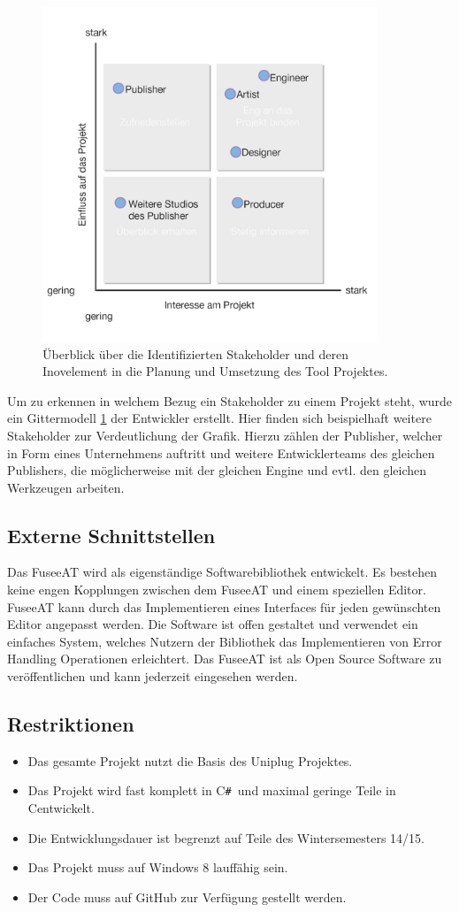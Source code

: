 \documentclass[pagesize, paper=a4, fontsize=12pt, titlepage=true, headings=small, headnosepline, abstractoff, liststotoc, nochapterprefix, plainheadsepline, twoside]{scrreprt}
\newcommand{\CSS}{C\texttt{\# }}
\newcommand{\CPP}{C\nolinebreak\hspace{-.05em}\raisebox{.4ex}{\tiny\bf +}\nolinebreak\hspace{-.10em}\raisebox{.4ex}{\tiny\bf +}}
\begin{document}
\begin{figure}[ht]
	\centering
	\includegraphics[width=10cm]{Bilder/Stakeholder_Diagramm.jpg}
	\caption{Überblick über die Identifizierten Stakeholder und deren Inovelement in die Planung und Umsetzung des Tool Projektes.}
	\label{StakeholderGrafik}
\end{figure}
Um zu erkennen in welchem Bezug ein Stakeholder zu einem Projekt steht, wurde ein Gittermodell \ref{StakeholderGrafik} der Entwickler erstellt. Hier finden sich beispielhaft weitere Stakeholder zur Verdeutlichung der Grafik. Hierzu zählen der Publisher, welcher in Form eines Unternehmens auftritt und weitere Entwicklerteams des gleichen Publishers, die möglicherweise mit der gleichen Engine und evtl. den gleichen Werkzeugen arbeiten.

\subsection{Externe Schnittstellen}
Das FuseeAT wird als eigenständige Softwarebibliothek entwickelt. Es bestehen keine engen Kopplungen zwischen dem FuseeAT und einem speziellen Editor. FuseeAT kann durch das Implementieren eines Interfaces für jeden gewünschten Editor angepasst werden. Die Software ist offen gestaltet und verwendet ein einfaches System, welches Nutzern der Bibliothek das Implementieren von Error Handling Operationen erleichtert. Das FuseeAT ist als Open Source Software zu veröffentlichen und kann jederzeit eingesehen werden.

\subsection{Restriktionen}
\begin{itemize}
\item Das gesamte Projekt nutzt die Basis des Uniplug Projektes.
\item Das Projekt wird fast komplett in \CSS und maximal geringe Teile in \CPP entwickelt.
\item Die Entwicklungsdauer ist begrenzt auf Teile des Wintersemesters 14/15.
\item Das Projekt muss auf Windows 8 lauffähig sein.
\item Der Code muss auf GitHub zur Verfügung gestellt werden.
\end{itemize}
\end{document}
